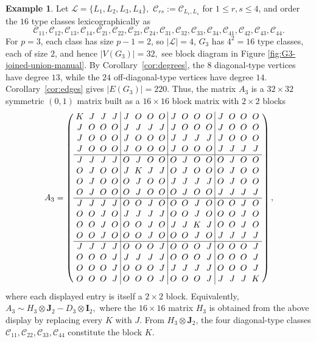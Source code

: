 \documentclass[12pt]{article}
\theoremstyle{definition}
\newtheorem{example}[theorem]{Example}
\newcommand{\calL}{\mathcal{L}}
\newcommand{\calC}{\mathcal{C}}
\newcommand{\I}{\mathbf{I}}
\newcommand{\J}{\mathbf{J}}
\begin{document}
	\begin{example}\label{ex:p3types}
		Let $\calL=\{L_1,L_2,L_3,L_4\},$ $\calC_{rs}:=\calC_{L_r,L_s}$ for $1\le r,s\le 4$, and order the $16$ type classes lexicographically as
		$$
		\calC_{11},\calC_{12},\calC_{13},\calC_{14},
		\calC_{21},\calC_{22},\calC_{23},\calC_{24},
		\calC_{31},\calC_{32},\calC_{33},\calC_{34},
		\calC_{41},\calC_{42},\calC_{43},\calC_{44}.
		$$
		For $p=3$, each class has size $p-1=2$, so $|\calL|=4$, $G_3$ has $4^2=16$ type classes, each of size $2$, and hence
		$|V(G_3)|=32,$ see block diagram in Figure \ref{fig:G3-joined-union-manual}.
		By Corollary~\ref{cor:degrees}, the $8$ diagonal-type vertices have degree $13$, while the $24$ off-diagonal-type vertices have degree $14$. Corollary~\ref{cor:edges} gives $|E(G_3)|=220.$ 
		Thus, the matrix $A_3$ is a $32\times 32$ symmetric $(0,1)$ matrix built as a $16\times16$ block matrix with $2\times2$ blocks
		$$
		\renewcommand{\arraystretch}{1.05}
		\setlength{\arraycolsep}{2.8pt}
		A_3=
		\left(
		\begin{array}{cccc|cccc|cccc|cccc}
			K&J&J&J&J&O&O&O&J&O&O&O&J&O&O&O\\
			J&O&O&O&J&J&J&J&J&O&O&O&J&O&O&O\\
			J&O&O&O&J&O&O&O&J&J&J&J&J&O&O&O\\
			J&O&O&O&J&O&O&O&J&O&O&O&J&J&J&J\\
			\hline
			J&J&J&J&O&J&O&O&O&J&O&O&O&J&O&O\\
			O&J&O&O&J&K&J&J&O&J&O&O&O&J&O&O\\
			O&J&O&O&O&J&O&O&J&J&J&J&O&J&O&O\\
			O&J&O&O&O&J&O&O&O&J&O&O&J&J&J&J\\
			\hline
			J&J&J&J&O&O&J&O&O&O&J&O&O&O&J&O\\
			O&O&J&O&J&J&J&J&O&O&J&O&O&O&J&O\\
			O&O&J&O&O&O&J&O&J&J&K&J&O&O&J&O\\
			O&O&J&O&O&O&J&O&O&O&J&O&J&J&J&J\\
			\hline
			J&J&J&J&O&O&O&J&O&O&O&J&O&O&O&J\\
			O&O&O&J&J&J&J&J&O&O&O&J&O&O&O&J\\
			O&O&O&J&O&O&O&J&J&J&J&J&O&O&O&J\\
			O&O&O&J&O&O&O&J&O&O&O&J&J&J&J&K
		\end{array}
		\right),
		$$
		where each displayed entry is itself a $2\times2$ block. Equivalently, $A_3\sim H_3\otimes \J_2-D_3\otimes \I_2,$ where the $16\times16$ matrix $H_3$ is obtained from the above display by replacing every $K$ with $J$. From $H_3\otimes \J_2$, the four diagonal-type classes $\calC_{11},\calC_{22},\calC_{33},\calC_{44}$ constitute the block $K$.
	\end{example}
	
\end{document}
